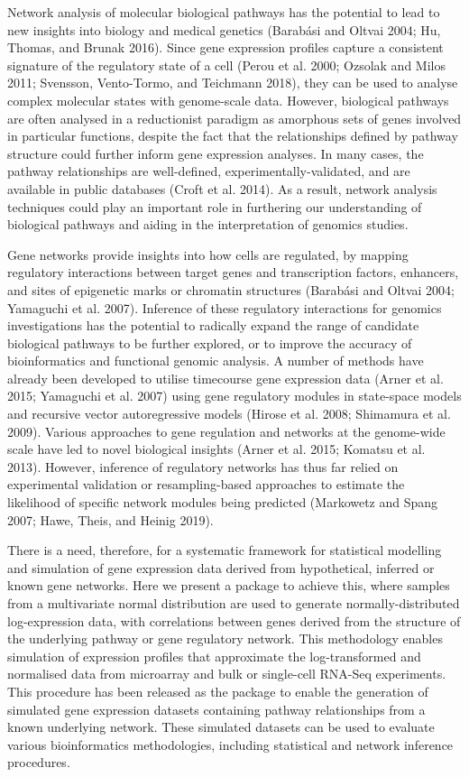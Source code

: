 \documentclass[]{article}
\begin{document}
Network analysis of molecular biological pathways has the potential to
lead to new insights into biology and medical genetics (Barabási and
Oltvai 2004; Hu, Thomas, and Brunak 2016). Since gene expression
profiles capture a consistent signature of the regulatory state of a
cell (Perou et al. 2000; Ozsolak and Milos 2011; Svensson, Vento-Tormo,
and Teichmann 2018), they can be used to analyse complex molecular
states with genome-scale data. However, biological pathways are often
analysed in a reductionist paradigm as amorphous sets of genes involved
in particular functions, despite the fact that the relationships defined
by pathway structure could further inform gene expression analyses. In
many cases, the pathway relationships are well-defined,
experimentally-validated, and are available in public databases (Croft
et al. 2014). As a result, network analysis techniques could play an
important role in furthering our understanding of biological pathways
and aiding in the interpretation of genomics studies.

Gene networks provide insights into how cells are regulated, by mapping
regulatory interactions between target genes and transcription factors,
enhancers, and sites of epigenetic marks or chromatin structures
(Barabási and Oltvai 2004; Yamaguchi et al. 2007). Inference of these
regulatory interactions for genomics investigations has the potential to
radically expand the range of candidate biological pathways to be
further explored, or to improve the accuracy of bioinformatics and
functional genomic analysis. A number of methods have already been
developed to utilise timecourse gene expression data (Arner et al. 2015;
Yamaguchi et al. 2007) using gene regulatory modules in state-space
models and recursive vector autoregressive models (Hirose et al. 2008;
Shimamura et al. 2009). Various approaches to gene regulation and
networks at the genome-wide scale have led to novel biological insights
(Arner et al. 2015; Komatsu et al. 2013). However, inference of
regulatory networks has thus far relied on experimental validation or
resampling-based approaches to estimate the likelihood of specific
network modules being predicted (Markowetz and Spang 2007; Hawe, Theis,
and Heinig 2019).

There is a need, therefore, for a systematic framework for statistical
modelling and simulation of gene expression data derived from
hypothetical, inferred or known gene networks. Here we present a package
to achieve this, where samples from a multivariate normal distribution
are used to generate normally-distributed log-expression data, with
correlations between genes derived from the structure of the underlying
pathway or gene regulatory network. This methodology enables simulation
of expression profiles that approximate the log-transformed and
normalised data from microarray and bulk or single-cell RNA-Seq
experiments. This procedure has been released as the package to enable
the generation of simulated gene expression datasets containing pathway
relationships from a known underlying network. These simulated datasets
can be used to evaluate various bioinformatics methodologies, including
statistical and network inference procedures.
\end{document}

